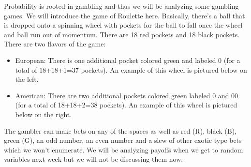 \documentclass[12pt]{article}
\newcommand{\spc}[1]{\iftoggle{spacingmode}{\\ \vspace{#1cm}}}
\begin{document}

\problem Probability is rooted in gambling and thus we will be analyzing some gambling games. We will introduce the game of Roulette here. Basically, there's a ball that is dropped onto a spinning wheel with pockets for the ball to fall once the wheel and ball run out of momentum. There are 18 red pockets and 18 black pockets. There are two flavors of the game:

\begin{itemize}
\item European: There is one additional pocket colored green and labeled 0 (for a total of 18+18+1=37 pockets). An example of this wheel is pictured below on the left.
\item American: There are two additional pockets colored green labeled 0 and 00 (for a total of 18+18+2=38 pockets). An example of this wheel is pictured below on the right.
\end{itemize}

The gambler can make bets on any of the spaces as well as red (R), black (B), green (G), an odd number, an even number and a slew of other exotic type bets which we won't enumerate. We will be analyzing payoffs when we get to random variables next week but we will not be discussing them now.
\end{document}
